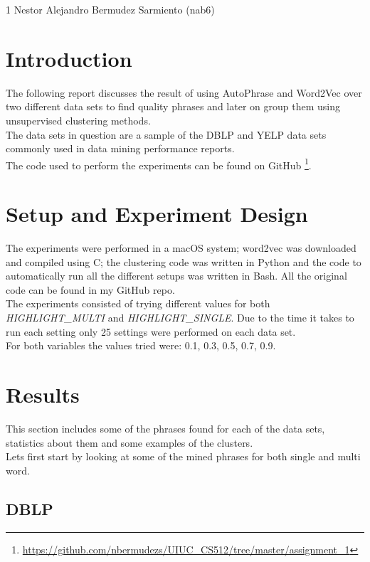 \documentclass[11pt]{article}
\begin{document}
\homework
    {1}
    {Nestor Alejandro Bermudez Sarmiento (nab6)}
    {}

\section*{Introduction}
The following report discusses the result of using AutoPhrase and Word2Vec over two different data sets to find quality phrases and later on group them using unsupervised clustering methods.\\

The data sets in question are a sample of the DBLP and YELP data sets commonly used in data mining performance reports. \\

The code used to perform the experiments can be found on GitHub \footnote{\url{https://github.com/nbermudezs/UIUC_CS512/tree/master/assignment_1}}. 

\section*{Setup and Experiment Design}
The experiments were performed in a macOS system; word2vec was downloaded and compiled using C; the clustering code was written in Python and the code to automatically run all the different setups was written in Bash. All the original code can be found in my GitHub repo.\\

The experiments consisted of trying different values for both \textit{HIGHLIGHT\_MULTI} and \textit{HIGHLIGHT\_SINGLE}. Due to the time it takes to run each setting only 25 settings were performed on each data set. \\
For both variables the values tried were: 0.1, 0.3, 0.5, 0.7, 0.9.

\section*{Results}
This section includes some of the phrases found for each of the data sets, statistics about them and some examples of the clusters. \\

Lets first start by looking at some of the mined phrases for both single and multi word.

\subsection*{DBLP}
\end{document}
